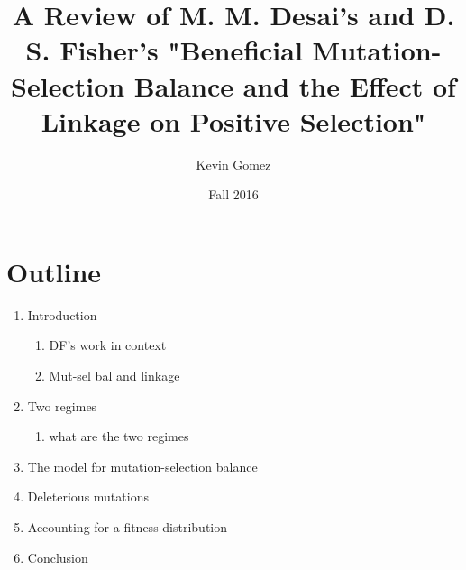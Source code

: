 \documentclass[12pt,twocolumn]{article}
\title{A Review of M. M. Desai's and D. S. Fisher's "Beneficial Mutation-Selection Balance and the Effect of Linkage on Positive Selection"}
\date{Fall 2016}
\author{Kevin Gomez}
\begin{document}
\maketitle
\newpage

\section{Outline}
\begin{enumerate}
\item Introduction
	\begin{enumerate}
	\item DF's work in context
	\item Mut-sel bal and linkage
	\end{enumerate}
\item Two regimes
	\begin{enumerate}
	\item what are the two regimes
	\end{enumerate}
\item The model for mutation-selection balance

\item Deleterious mutations

\item Accounting for a fitness distribution

\item Conclusion
\end{enumerate}

%
\end{document}
